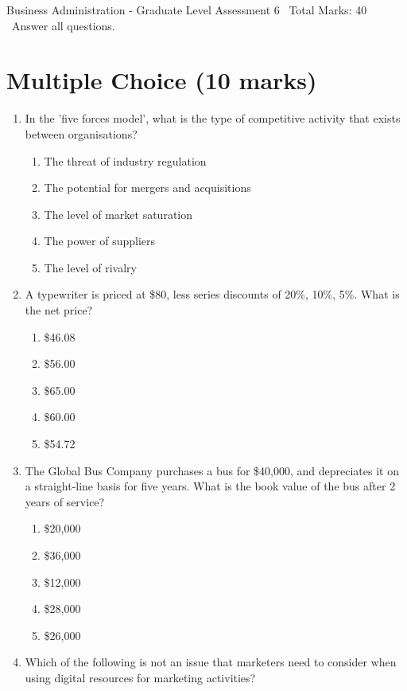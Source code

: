 \documentclass[12pt]{article}
\begin{document}
\begin{center}
Business Administration - Graduate Level Assessment 6 \
Total Marks: 40 \
Answer all questions.
\end{center}

\section*{Multiple Choice (10 marks)}
\begin{enumerate}[label=\arabic*.]
\item In the 'five forces model', what is the type of competitive activity that exists between organisations?
\begin{enumerate}[label=(\alph*)]
    \item The threat of industry regulation
    \item The potential for mergers and acquisitions
    \item The level of market saturation
    \item The power of suppliers
    \item The level of rivalry
\end{enumerate}
\item A typewriter is priced at \$80, less series discounts of 20\%, 10\%, 5\%. What is the net price?
\begin{enumerate}[label=(\alph*)]
    \item \$46.08
    \item \$56.00
    \item \$65.00
    \item \$60.00
    \item \$54.72
\end{enumerate}
\item The Global Bus Company purchases a bus for \$40,000, and depreciates it on a straight-line basis for five years. What is the book value of the bus after 2 years of service?
\begin{enumerate}[label=(\alph*)]
    \item \$20,000
    \item \$36,000
    \item \$12,000
    \item \$28,000
    \item \$26,000
\end{enumerate}
\item Which of the following is not an issue that marketers need to consider when using digital resources for marketing activities?
\begin{enumerate}[label=(\alph*)]

\end{enumerate}
\end{enumerate}
\end{document}

